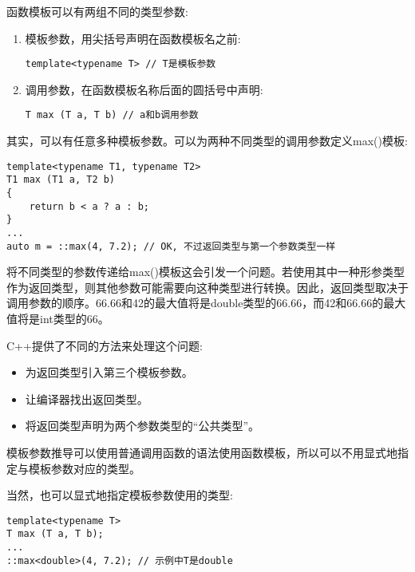 
函数模板可以有两组不同的类型参数:

\begin{enumerate}
\item 
模板参数，用尖括号声明在函数模板名之前:
\begin{lstlisting}[style=styleCXX]
template<typename T> // T是模板参数
\end{lstlisting}

\item 
调用参数，在函数模板名称后面的圆括号中声明:
\begin{lstlisting}[style=styleCXX]
T max (T a, T b) // a和b调用参数
\end{lstlisting}
\end{enumerate}

其实，可以有任意多种模板参数。可以为两种不同类型的调用参数定义max()模板:

\begin{lstlisting}[style=styleCXX]
template<typename T1, typename T2>
T1 max (T1 a, T2 b)
{
	return b < a ? a : b;
}
...
auto m = ::max(4, 7.2); // OK, 不过返回类型与第一个参数类型一样
\end{lstlisting}

将不同类型的参数传递给max()模板这会引发一个问题。若使用其中一种形参类型作为返回类型，则其他参数可能需要向这种类型进行转换。因此，返回类型取决于调用参数的顺序。66.66和42的最大值将是double类型的66.66，而42和66.66的最大值将是int类型的66。

C++提供了不同的方法来处理这个问题:

\begin{itemize}
\item
为返回类型引入第三个模板参数。

\item
让编译器找出返回类型。

\item
将返回类型声明为两个参数类型的“公共类型”。
\end{itemize}


模板参数推导可以使用普通调用函数的语法使用函数模板，所以可以不用显式地指定与模板参数对应的类型。

当然，也可以显式地指定模板参数使用的类型:

\begin{lstlisting}[style=styleCXX]
template<typename T>
T max (T a, T b);
...
::max<double>(4, 7.2); // 示例中T是double
\end{lstlisting}


